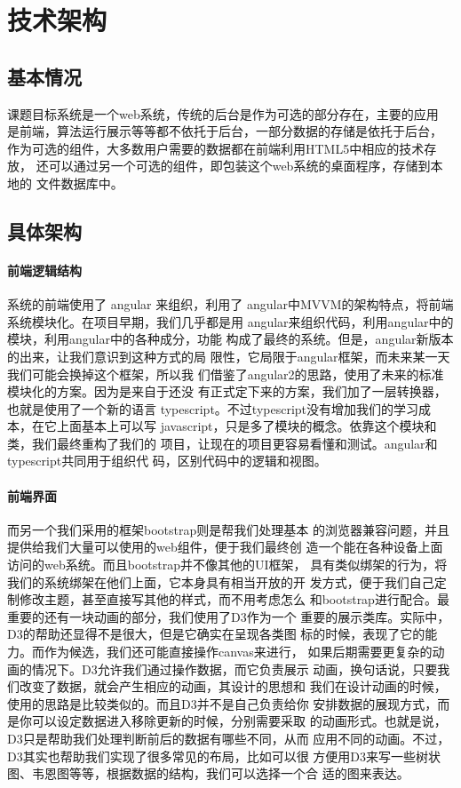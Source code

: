 \section{技术架构}
\subsection{基本情况}
课题目标系统是一个web系统，传统的后台是作为可选的部分存在，主要的应用
是前端，算法运行展示等等都不依托于后台，一部分数据的存储是依托于后台，
作为可选的组件，大多数用户需要的数据都在前端利用HTML5中相应的技术存放，
还可以通过另一个可选的组件，即包装这个web系统的桌面程序，存储到本地的
文件数据库中。
\subsection{具体架构}
\paragraph{前端逻辑结构} 系统的前端使用了 angular 来组织，利用了
angular中MVVM的架构特点，将前端系统模块化。在项目早期，我们几乎都是用
angular来组织代码，利用angular中的模块，利用angular中的各种成分，功能
构成了最终的系统。但是，angular新版本的出来，让我们意识到这种方式的局
限性，它局限于angular框架，而未来某一天我们可能会换掉这个框架，所以我
们借鉴了angular2的思路，使用了未来的标准模块化的方案。因为是来自于还没
有正式定下来的方案，我们加了一层转换器，也就是使用了一个新的语言
typescript。不过typescript没有增加我们的学习成本，在它上面基本上可以写
javascript，只是多了模块的概念。依靠这个模块和类，我们最终重构了我们的
项目，让现在的项目更容易看懂和测试。angular和typescript共同用于组织代
码，区别代码中的逻辑和视图。
\paragraph{前端界面} 而另一个我们采用的框架bootstrap则是帮我们处理基本
的浏览器兼容问题，并且提供给我们大量可以使用的web组件，便于我们最终创
造一个能在各种设备上面访问的web系统。而且bootstrap并不像其他的UI框架，
具有类似绑架的行为，将我们的系统绑架在他们上面，它本身具有相当开放的开
发方式，便于我们自己定制修改主题，甚至直接写其他的样式，而不用考虑怎么
和bootstrap进行配合。最重要的还有一块动画的部分，我们使用了D3作为一个
重要的展示类库。实际中，D3的帮助还显得不是很大，但是它确实在呈现各类图
标的时候，表现了它的能力。而作为候选，我们还可能直接操作canvas来进行，
如果后期需要更复杂的动画的情况下。D3允许我们通过操作数据，而它负责展示
动画，换句话说，只要我们改变了数据，就会产生相应的动画，其设计的思想和
我们在设计动画的时候，使用的思路是比较类似的。而且D3并不是自己负责给你
安排数据的展现方式，而是你可以设定数据进入移除更新的时候，分别需要采取
的动画形式。也就是说，D3只是帮助我们处理判断前后的数据有哪些不同，从而
应用不同的动画。不过，D3其实也帮助我们实现了很多常见的布局，比如可以很
方便用D3来写一些树状图、韦恩图等等，根据数据的结构，我们可以选择一个合
适的图来表达。
